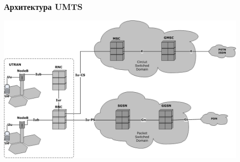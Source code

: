 \documentclass[utf8]{beamer}
\begin{document}
\begin{frame}
\frametitle{Архитектура UMTS}
\includegraphics[width=0.93\textwidth]{pic/UmtsArchitecture.png}
\end{frame}
\end{document}
